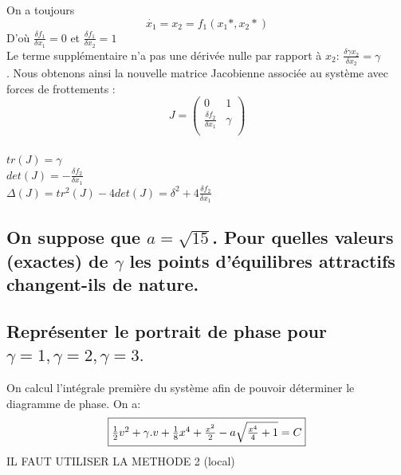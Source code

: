 \documentclass[10pt,a4paper]{article}
\begin{document}
On a toujours \[\dot{x_1}=x_2=f_1(x_1*,x_2*)\]
D'où $\frac{\delta f_1}{\delta x_1}=0$ et $\frac{\delta f_1}{\delta x_2}=1$\\
Le terme supplémentaire n'a pas une dérivée nulle par rapport à $x_2$: $\frac{\delta \gamma x_2}{\delta x_2}=\gamma$\\.
Nous obtenons ainsi la nouvelle matrice Jacobienne associée au système avec forces de frottements :
\[
J=
\begin{pmatrix}
0 & 1\\
\frac{\delta f_2}{\delta x_1} & \gamma\\
\end{pmatrix}
\]
\\
$tr(J) = \gamma $\\
$det(J) = -\frac{\delta f_2}{\delta x_1} $\\
$\Delta(J) = tr^2(J)-4det(J)=\delta^2 + 4\frac{\delta f_2}{\delta x_1}$\\



\subsection{On suppose que $a=\sqrt{15}$. Pour quelles valeurs (exactes) de $\gamma$ les points d'équilibres attractifs changent-ils de nature.}

\subsection{Représenter le portrait de phase pour $\gamma=1, \gamma=2, \gamma=3.$}
On calcul l'intégrale première du système afin de pouvoir déterminer le diagramme de phase. On a:
\[\fbox{$ \frac{1}{2}v^2 + \gamma.v + \frac{1}{8}x^4 + \frac{x^2}{2} - a\sqrt{\frac{x^4}{4} + 1} = C  $}\]
IL FAUT UTILISER LA METHODE 2 (local)
\end{document}
